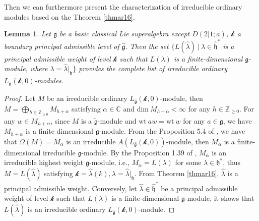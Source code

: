 \documentclass[12pt]{article}
\newtheorem{lem}[thm]{Lemma}
\begin{document}
Then we can furthermore present the characterization of irreducible ordinary modules based on the Theorem \ref{thmar16}.
\begin{lem}\label{lemor}
Let $\mathfrak{g}$ be a basic classical Lie superalgebra
except $D(2|1;a)$, $\mathcal{k}$ a boundary principal admissible level of $\widehat{\mathfrak{g}}$.
Then the set $\{L(\hat{\lambda})~|~\hat{\lambda}\in \widehat{\mathfrak{h}}^*$ is a principal admissible weight of level $\mathcal{k}$ such that $L(\lambda)$
is a finite-dimensional $\mathfrak{g}$-module, where $\lambda=\hat{\lambda}|_{\mathfrak{h}}\}$
provides the complete list of irreducible ordinary $L_{\widehat{\mathfrak{g}}}(\mathcal{k},0)$-modules.
\end{lem}
\begin{proof}
Let $M$ be an irreducible ordinary $L_{\widehat{\mathfrak{g}}}(\mathcal{k},0)$-module, then
$M=\bigoplus_{h\in\mathbb{Z}_{\geq 0}}M_{h+\alpha}$ satisfying $\alpha\in\mathbb{C}$ and
$\mbox{dim}~M_{h+\alpha}<\infty$ for any $h\in\mathbb{Z}_{\geq 0}$.
For any $w\in M_{h+\alpha}$,
since $M$ is a $\tilde{\mathfrak{g}}$-module
and $\mbox{wt}~aw=\mbox{wt}~w$ for any $a \in\mathfrak{g}$,
we have $M_{h+\alpha}$ is a finite dimensional $\mathfrak{g}$-module.
From the Proposition 5.4 of \cite{DLM98},
we have that $\Omega(M)=M_{\alpha}$ is an irreducible $A(L_{\widehat{\mathfrak{g}}}(\mathcal{k},0))$-module,
then $M_{\alpha}$ is a finite-dimensional irreducible $\mathfrak{g}$-module.
By the Proposition 1.39 of \cite{CW12}, $M_{\alpha}$ is an irreducible highest weight $\mathfrak{g}$-module,
i.e., $M_{\alpha}=L(\lambda)$ for some $\lambda\in \mathfrak{h}^*$, thus $M=L(\hat{\lambda})$ satisfying $\mathcal{k}=\hat{\lambda}(k),\lambda=\hat{\lambda}|_{\mathfrak{h}}$.
From Theorem \ref{thmar16}, $\hat{\lambda}$ is a principal admissible weight.
Conversely, let $\hat{\lambda}\in \widehat{\mathfrak{h}}^*$ be a principal admissible weight of level $\mathcal{k}$ such that $L(\lambda)$
is a finite-dimensional $\mathfrak{g}$-module,
it shows that $L(\hat{\lambda})$ is an irreducible ordinary $L_{\widehat{\mathfrak{g}}}(\mathcal{k},0)$-module.
\end{proof}
\end{document}
